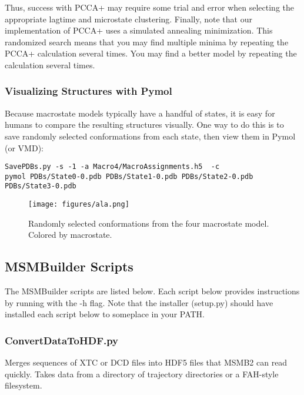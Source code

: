 \documentclass[12pt]{article}
\begin{document}
Thus, success with PCCA+ may require some trial and error when selecting the appropriate lagtime and microstate clustering.  Finally, note that our implementation of PCCA+ uses a simulated annealing minimization.  This randomized search means that you may find multiple minima by repeating the PCCA+ calculation several times.  You may find a better model by repeating the calculation several times.  

\subsubsection{Visualizing Structures with Pymol}

Because macrostate models typically have a handful of states, it is easy for humans to compare the resulting structures visually.  One way to do this 
is to save randomly selected conformations from each state, then view them in Pymol (or VMD):

\begin{verbatim}
SavePDBs.py -s -1 -a Macro4/MacroAssignments.h5  -c 
pymol PDBs/State0-0.pdb PDBs/State1-0.pdb PDBs/State2-0.pdb PDBs/State3-0.pdb
\end{verbatim}

\begin{figure}
\begin{center}
\texttt{[image: figures/ala.png]}
\caption{Randomly selected conformations from the four macrostate model.  Colored by macrostate.}
\end{center}
\end{figure}


\newpage

\subsection{MSMBuilder Scripts}

The MSMBuilder scripts are listed below.  Each script below provides instructions by running with the -h flag.  Note that the installer (setup.py) should have installed each script below to someplace in your PATH.  

\subsubsection{ConvertDataToHDF.py}

Merges sequences of XTC or DCD files into HDF5 files that MSMB2 can read quickly.  Takes data from a directory of trajectory directories or a FAH-style filesystem.  
\end{document}
